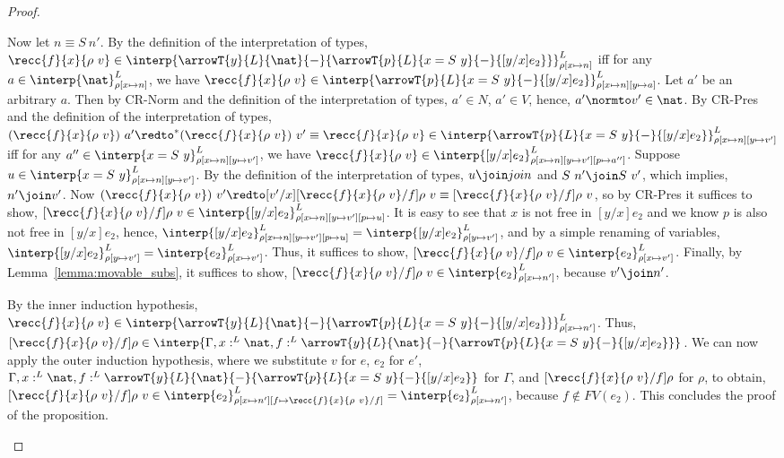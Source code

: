\begin{proof}
\begin{itemize}
  \noindent
  Now let $n \equiv S\ n'$.  By the definition of the interpretation
  of types, $\recc{f}{x}{\rho\ v} \in
  \interp{\arrowT{y}{L}{\nat}{-}{\arrowT{p}{L}{x =
  S\ y}{-}{[y/x]e_2}}}^L_{\rho[x \mapsto n]}$ iff for any $a
  \in \interp{\nat}^L_{\rho[x \mapsto n]}$, we have
  $\recc{f}{x}{\rho\ v} \in \interp{\arrowT{p}{L}{x =
  S\ y}{-}{[y/x]e_2}}^L_{\rho[x \mapsto n][y \mapsto a]}$.  Let
  $a'$ be an arbitrary $a$. Then by CR-Norm and the definition of the
  interpretation of types, $a' \in N$, $a' \in V$, hence, $a' \normto
  v' \in \nat$.  By CR-Pres and the definition of the interpretation of
  types, $(\recc{f}{x}{\rho\ v})\ a' \redto^*
  (\recc{f}{x}{\rho\ v})\ v' \equiv \recc{f}{x}{\rho\ v} \in 
  \interp{\arrowT{p}{L}{x = S\ y}{-}{[y/x]e_2}}^L_{\rho[x \mapsto n][y \mapsto v']}$ iff
  for any $a'' \in \interp{x = S\ y}^L_{\rho[x \mapsto n][y \mapsto v']}$, we have 
  $\recc{f}{x}{\rho\ v} \in
  \interp{[y/x]e_2}^L_{\rho[x \mapsto n][y \mapsto v'][p \mapsto 
  a'']}$. Suppose $u \in \interp{x = S\ y}^L_{\rho[x \mapsto n][y \mapsto v']}$.  
  By the definition of the
  interpretation of types, $u \join join$ and $S\ n' \join S\ v'$,
  which implies, $n' \join v'$.  Now $(\recc{f}{x}{\rho\ v})\ v'
  \redto [v'/x][\recc{f}{x}{\rho\ v}/f]\rho\ v \equiv 
  [\recc{f}{x}{\rho\ v}/f]\rho\ v$, so by CR-Pres it
  suffices to show, $[\recc{f}{x}{\rho\ v}/f]\rho\ v \in
  \interp{[y/x]e_2}^L_{\rho[x \mapsto n][y \mapsto v'][p \mapsto
  u]}$.  It is easy to see that $x$ is not free in $[y/x]e_2$ and
  we know $p$ is also not free
  in $[y/x]e_2$, hence, $\interp{[y/x]e_2}^L_{\rho[x \mapsto n][y
  \mapsto v'][p \mapsto u]} = \interp{[y/x]e_2}^L_{\rho[y
  \mapsto v']}$, and by a simple renaming of variables,
  $\interp{[y/x]e_2}^L_{\rho[y \mapsto v']} =
  \interp{e_2}^L_{\rho[x \mapsto v']}$.  Thus, it suffices to show,
  $[\recc{f}{x}{\rho\ v}/f]\rho\ v \in
  \interp{e_2}^L_{\rho[x \mapsto v']}$.  Finally, by  
  Lemma~\ref{lemma:movable_subs},
  it suffices to show, $[\recc{f}{x}{\rho\ v}/f]\rho\ v \in
  \interp{e_2}^L_{\rho[x \mapsto n']}$, because $v' \join n'$.

  \noindent
  By the inner induction hypothesis, $\recc{f}{x}{\rho\ v} \in
  \interp{\arrowT{y}{L}{\nat}{-}{\arrowT{p}{L}{x =
  S\ y}{-}{[y/x]e_2}}}^L_{\rho[x \mapsto n']}$.
  Thus, $[\recc{f}{x}{\rho\ v}/f]\rho \in
  \interp{\Gamma,x:^L \nat, f:^L
  \arrowT{y}{L}{\nat}{-}{\arrowT{p}{L}{x = S\ y}{-}{[y/x]e_2}}}$.
  We can now apply the outer induction hypothesis, where we substitute
  $v$ for $e$, $e_2$ for $e'$, $\Gamma,x:^L \nat,f:^L
  \arrowT{y}{L}{\nat}{-}{\arrowT{p}{L}{x = S\ y}{-}{[y/x]e_2}}$ for
  $\Gamma$, and $[\recc{f}{x}{\rho\ v}/f]\rho$ for $\rho$,
  to obtain, $[\recc{f}{x}{\rho\ v}/f]\rho\ v \in
  \interp{e_2}^L_{\rho[x \mapsto n'][f \mapsto
  \recc{f}{x}{\rho\ v}/f]} = \interp{e_2}^L_{\rho[x \mapsto
  n']}$, because $f \not \in FV(e_2)$.  This concludes the proof of the proposition.


\end{itemize}
\end{proof}
